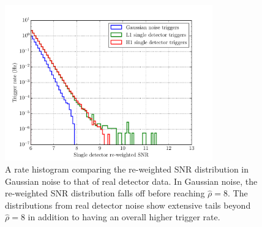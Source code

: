 \begin{figure}[ht!]%
\centering
  \includegraphics[width=0.8\textwidth]{figures/o1-cbc-dq-paper/H1-L1-Gaussian-newSNR-rate-hist}
  \caption[Rate histogram of PyCBC triggers vs. Gaussian noise]{A rate histogram %
           comparing the re-weighted SNR distribution in Gaussian %
           noise to that of real detector data. In Gaussian noise, the re-weighted %
           SNR distribution falls off before reaching $\hat{\rho} = 8$. %
           The distributions from real detector noise show extensive tails beyond %
           $\hat{\rho} = 8$ in addition to having an overall higher trigger rate.}
\label{fig:gaussian-rate}
\end{figure}



